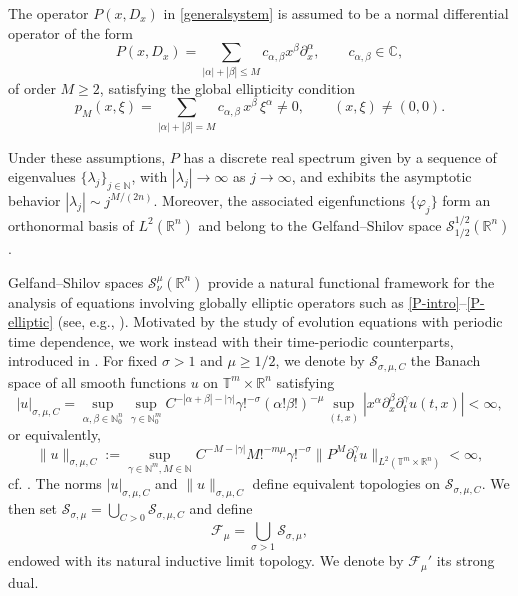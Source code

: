 \documentclass[12pt,reqno]{amsart}
\theoremstyle{definition}
\numberwithin{equation}{section}
\begin{document}
The operator $P(x,D_x)$ in \eqref{generalsystem} is assumed to be a normal
differential operator of the form
\begin{equation}\label{P-intro}
	P(x,D_x)=\sum_{|\alpha|+|\beta|\le M}
	c_{\alpha,\beta} x^\beta \partial_x^\alpha,
	\qquad c_{\alpha,\beta}\in\mathbb{C},
\end{equation}
of order $M\ge2$, satisfying the global ellipticity condition
\begin{equation}\label{P-elliptic}
	p_M(x,\xi)=\sum_{|\alpha|+|\beta|=M}
	c_{\alpha,\beta}\,x^\beta\,\xi^\alpha\neq0,
	\qquad (x,\xi)\neq(0,0).
\end{equation}

Under these assumptions, $P$ has a discrete real spectrum given by a sequence of eigenvalues
$\{\lambda_j\}_{j\in\mathbb{N}}$, with $|\lambda_j|\to\infty$ as
$j\to\infty$, and exhibits the asymptotic behavior
$|\lambda_j|\sim j^{M/(2n)}$.
Moreover, the associated eigenfunctions $\{\varphi_j\}$ form an orthonormal
basis of $L^2(\mathbb{R}^n)$ and belong to the Gelfand--Shilov space
$\mathcal{S}^{1/2}_{1/2}(\mathbb{R}^n)$.

Gelfand--Shilov spaces $\mathcal{S}^\mu_\nu(\mathbb{R}^n)$ provide a natural
functional framework for the analysis of equations involving globally
elliptic operators such as \eqref{P-intro}--\eqref{P-elliptic}
(see, e.g., \cite{CGR1,CGR2,Nicola-Rodino}).
Motivated by the study of evolution equations with periodic time
dependence, we work instead with their time-periodic counterparts,
introduced in \cite{AviCap22,AviCapKir25}.
For fixed $\sigma>1$ and $\mu\ge1/2$, we denote by
$\mathcal{S}_{\sigma,\mu,C}$ the Banach space of all smooth functions
$u$ on $\mathbb{T}^m\times\mathbb{R}^n$ satisfying
\begin{equation}\label{firstnorm}
	|u|_{\sigma,\mu,C}
	=
	\sup_{\alpha,\beta\in\mathbb{N}_0^n}
	\sup_{\gamma\in\mathbb{N}_0^m}
	C^{-|\alpha+\beta|-|\gamma|}
	\gamma!^{-\sigma}(\alpha!\beta!)^{-\mu}
	\sup_{(t,x)}
	|x^\alpha\partial_x^\beta\partial_t^\gamma u(t,x)|
	<\infty,
\end{equation}
or equivalently,
\begin{equation}\label{secondnorm}
 	\|u\|_{\sigma,\mu,C}:=\sup_{\gamma \in \mathbb{N}^m, M \in \mathbb{N}} C^{-M - |\gamma|} M!^{-m\mu} \gamma!^{-\sigma} \| P^M \partial_t^\gamma u \|_{L^2(\mathbb{T}^m \times \mathbb{R}^n)}<\infty,
\end{equation}
cf. \cite[Remark 2.1]{AviCapKir26}.
The norms $|u|_{\sigma,\mu,C}$ and $\|u\|_{\sigma,\mu,C}$ define equivalent topologies on $\mathcal{S}_{\sigma,\mu,C}$. We then set
$\mathcal{S}_{\sigma,\mu}=\bigcup_{C>0}\mathcal{S}_{\sigma,\mu,C}$
and define
\[
\mathscr{F}_\mu=\bigcup_{\sigma>1}\mathcal{S}_{\sigma,\mu},
\]
endowed with its natural inductive limit topology.
We denote by $\mathscr{F}_\mu'$ its strong dual.
\end{document}
